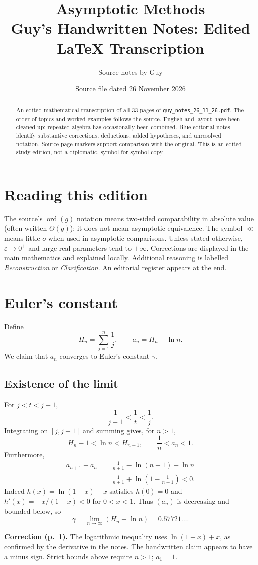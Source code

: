 \documentclass[11pt,a4paper]{article}
\title{Asymptotic Methods\\\large Guy's Handwritten Notes: Edited LaTeX Transcription}
\author{Source notes by Guy}
\date{Source file dated 26 November 2026}
\newcommand{\eps}{\varepsilon}
\DeclareMathOperator{\ord}{ord}
\newcommand{\src}[1]{\par\smallskip{\small\color{gray}Source PDF: page(s) #1.}\par}
\newcommand{\edit}[2]{\par\begingroup\small\color{blue!55!black}\textbf{#1.} #2\par\endgroup}
\numberwithin{equation}{section}
\begin{document}
\maketitle
\begin{abstract}
An edited mathematical transcription of all 33 pages of
\texttt{guy\_notes\_26\_11\_26.pdf}. The order of topics and worked
examples follows the source. English and layout have been cleaned up;
repeated algebra has occasionally been combined. Blue editorial notes
identify substantive corrections, deductions, added hypotheses, and
unresolved notation. Source-page markers support comparison with the original.
This is an edited study edition, not a diplomatic, symbol-for-symbol copy.
\end{abstract}
\tableofcontents
\section*{Reading this edition}
The source's $\ord(g)$ notation means two-sided comparability in absolute
value (often written $\Theta(g)$); it does not mean asymptotic equivalence.
The symbol $\ll$ means little-$o$ when used in asymptotic comparisons.
Unless stated otherwise, $\eps\to0^+$ and large real parameters tend to
$+\infty$. Corrections are displayed in the main mathematics and explained
locally. Additional reasoning is labelled \emph{Reconstruction} or
\emph{Clarification}. An editorial register appears at the end.

\section{Euler's constant}
\src{1--2}
Define
\begin{equation}
 H_n=\sum_{j=1}^n\frac1j,\qquad a_n=H_n-\ln n.
\end{equation}
We claim that $a_n$ converges to Euler's constant $\gamma$.
\subsection{Existence of the limit}
For $j<t<j+1$,
\[
 \frac1{j+1}<\frac1t<\frac1j.
\]
Integrating on $[j,j+1]$ and summing gives, for $n>1$,
\[
 H_n-1<\ln n<H_{n-1},\qquad \frac1n<a_n<1.
\]
Furthermore,
\begin{align}
 a_{n+1}-a_n
 &=\frac1{n+1}-\ln(n+1)+\ln n\\
 &=\frac1{n+1}+\ln\left(1-\frac1{n+1}\right)<0.
\end{align}
Indeed $h(x)=\ln(1-x)+x$ satisfies $h(0)=0$ and
$h'(x)=-x/(1-x)<0$ for $0<x<1$.
Thus $(a_n)$ is decreasing and bounded below, so
\[
 \gamma=\lim_{n\to\infty}(H_n-\ln n)=0.57721\ldots.
\]
\edit{Correction (p.~1)}{The logarithmic inequality uses
$\ln(1-x)+x$, as confirmed by the derivative in the notes. The handwritten
claim appears to have a minus sign. Strict bounds above require $n>1$;
$a_1=1$.}
\end{document}

